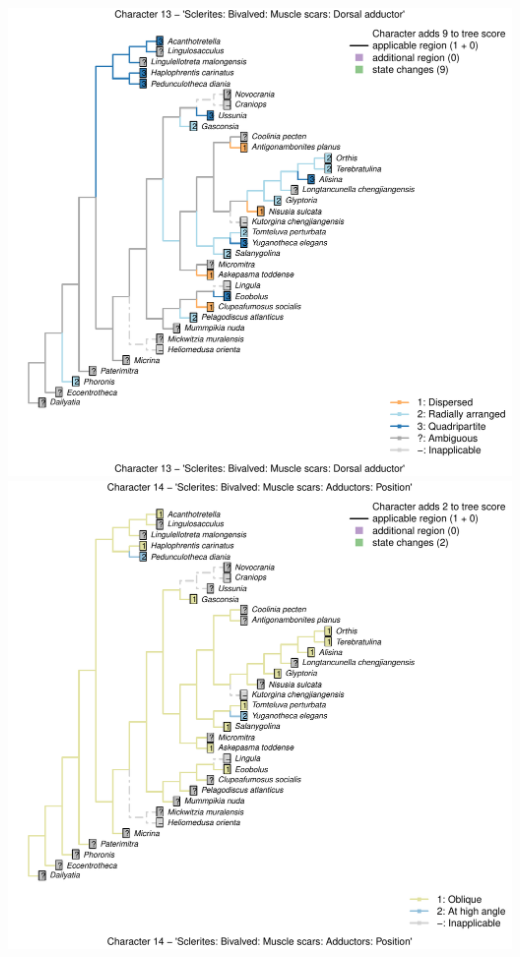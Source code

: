 \documentclass[]{book}
\theoremstyle{definition}
\theoremstyle{definition}
\theoremstyle{definition}
\theoremstyle{remark}
\begin{document}
\includegraphics{Brachiopod_phylogeny_files/figure-latex/unnamed-chunk-4-13.pdf}
\includegraphics{Brachiopod_phylogeny_files/figure-latex/unnamed-chunk-4-14.pdf}
\end{document}
